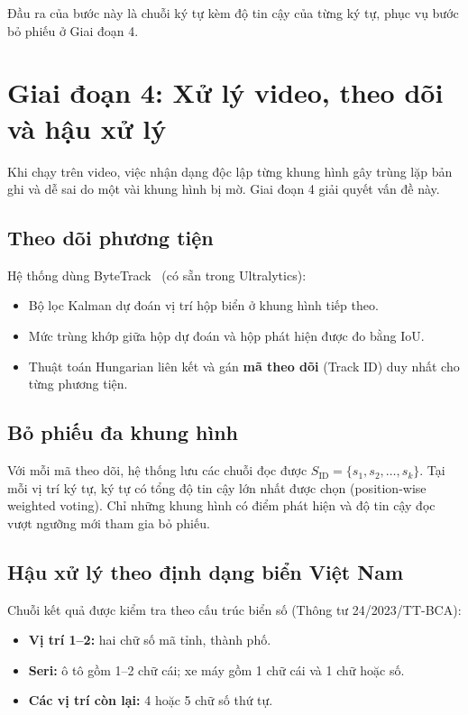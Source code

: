 Đầu ra của bước này là chuỗi ký tự kèm độ tin cậy của từng ký tự, phục vụ bước bỏ phiếu ở Giai đoạn 4.

\section{Giai đoạn 4: Xử lý video, theo dõi và hậu xử lý}

Khi chạy trên video, việc nhận dạng độc lập từng khung hình gây trùng lặp bản ghi và dễ sai do một vài khung hình bị mờ. Giai đoạn 4 giải quyết vấn đề này.

\subsection{Theo dõi phương tiện}

Hệ thống dùng ByteTrack~\cite{zhang2022bytetrack} (có sẵn trong Ultralytics):
\begin{itemize}
  \item Bộ lọc Kalman dự đoán vị trí hộp biển ở khung hình tiếp theo.
  \item Mức trùng khớp giữa hộp dự đoán và hộp phát hiện được đo bằng IoU.
  \item Thuật toán Hungarian liên kết và gán \textbf{mã theo dõi} (Track ID) duy nhất cho từng phương tiện.
\end{itemize}

\subsection{Bỏ phiếu đa khung hình}

Với mỗi mã theo dõi, hệ thống lưu các chuỗi đọc được $S_{\text{ID}} = \{s_1, s_2, \dots, s_k\}$. Tại mỗi vị trí ký tự, ký tự có tổng độ tin cậy lớn nhất được chọn (position-wise weighted voting). Chỉ những khung hình có điểm phát hiện và độ tin cậy đọc vượt ngưỡng mới tham gia bỏ phiếu.

\subsection{Hậu xử lý theo định dạng biển Việt Nam}

Chuỗi kết quả được kiểm tra theo cấu trúc biển số (Thông tư 24/2023/TT-BCA):
\begin{itemize}
  \item \textbf{Vị trí 1--2:} hai chữ số mã tỉnh, thành phố.
  \item \textbf{Seri:} ô tô gồm 1--2 chữ cái; xe máy gồm 1 chữ cái và 1 chữ hoặc số.
  \item \textbf{Các vị trí còn lại:} 4 hoặc 5 chữ số thứ tự.
\end{itemize}

